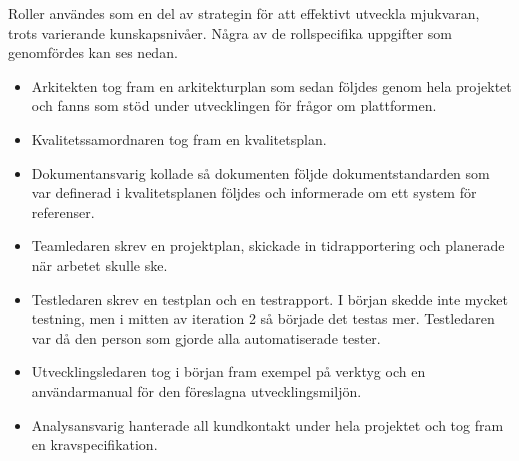 Roller användes som en del av strategin för att effektivt utveckla mjukvaran, trots varierande kunskapsnivåer. Några av de rollspecifika uppgifter som genomfördes kan ses nedan.
\begin{itemize}
\item Arkitekten tog fram en arkitekturplan som sedan följdes genom hela projektet och fanns som stöd under utvecklingen för frågor om plattformen.
\item Kvalitetssamordnaren tog fram en kvalitetsplan.
\item Dokumentansvarig kollade så dokumenten följde dokumentstandarden som var definerad i kvalitetsplanen följdes och informerade om ett system för referenser.
\item Teamledaren skrev en projektplan, skickade in tidrapportering och planerade när arbetet skulle ske.
\item Testledaren skrev en testplan och en testrapport. I början skedde inte mycket testning, men i mitten av iteration 2 så började det testas mer. Testledaren var då den person som gjorde alla automatiserade tester.
\item Utvecklingsledaren tog i början fram exempel på verktyg och en användar\-manual för den föreslagna utvecklingsmiljön.  
\item Analysansvarig hanterade all kundkontakt under hela projektet och tog fram en kravspecifikation. 
\end{itemize}   

